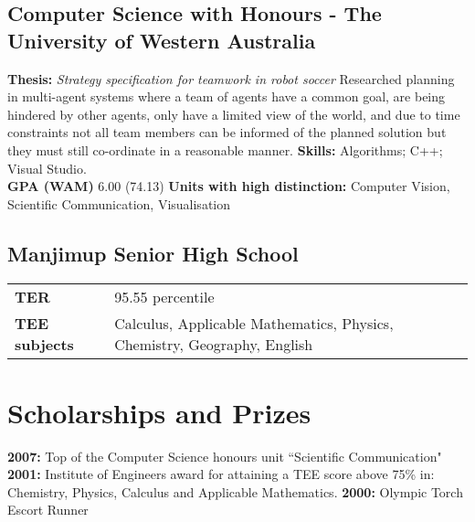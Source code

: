 \documentclass[10pt, a4paper]{report}
\begin{document}
\subsection*{Computer Science with Honours - The University of Western Australia} %
{\bf Thesis:} {\em Strategy specification for teamwork in robot soccer} \newline
Researched planning in multi-agent systems where a team of agents have a common goal, are being hindered by other agents, only have a limited view of the world, and due to time constraints not all team members can be informed of the planned solution but they must still co-ordinate in a reasonable manner. \newline
{\bf Skills:} Algorithms; C{\small ++}; Visual Studio. \\
{\bf GPA (WAM)} 6.00 (74.13) \newline
{\bf Units with high distinction:} Computer Vision, Scientific Communication, Visualisation


\subsection*{Manjimup Senior High School}
\vspace{-5pt}
\begin{tabular}[h]{ll}
{\bf TER} & 95.55 percentile\\
{\bf TEE subjects} & Calculus, Applicable Mathematics, Physics, Chemistry, Geography, English\\
\end{tabular}

\vfill

\section*{Scholarships and Prizes}
{\bf 2007:} Top of the Computer Science honours unit ``Scientific Communication" \newline
{\bf 2001:} Institute of Engineers award for attaining a TEE score above 75\% in:\\
 Chemistry, Physics, Calculus and Applicable Mathematics. \newline
{\bf 2000:} Olympic Torch Escort Runner
\end{document}
